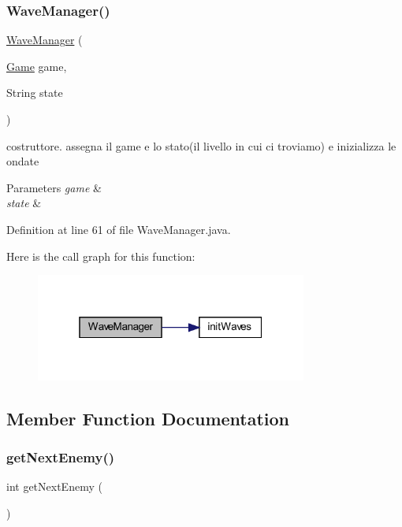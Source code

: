 \subsubsection{\texorpdfstring{Wave\+Manager()}{WaveManager()}}
{\footnotesize\ttfamily \hyperlink{classmanagers_1_1_wave_manager}{Wave\+Manager} (\begin{DoxyParamCaption}\item[{\hyperlink{classprogetto_1_1_game}{Game}}]{game,  }\item[{String}]{state }\end{DoxyParamCaption})}



costruttore. assegna il game e lo stato(il livello in cui ci troviamo) e inizializza le ondate 


\begin{DoxyParams}{Parameters}
{\em game} & \\
\hline
{\em state} & \\
\hline
\end{DoxyParams}


Definition at line 61 of file Wave\+Manager.\+java.

Here is the call graph for this function\+:\nopagebreak
\begin{figure}[H]
\begin{center}
\leavevmode
\includegraphics[width=253pt]{classmanagers_1_1_wave_manager_a4f9054a370c040f84d220fce947314f2_cgraph}
\end{center}
\end{figure}


\subsection{Member Function Documentation}
\mbox{\label{classmanagers_1_1_wave_manager_aa05f286f626db3fc63273f5c5cd64bca}} 
\subsubsection{\texorpdfstring{get\+Next\+Enemy()}{getNextEnemy()}}
{\footnotesize\ttfamily int get\+Next\+Enemy (\begin{DoxyParamCaption}{ }\end{DoxyParamCaption})}



